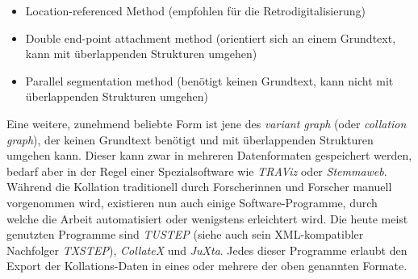 \documentclass{article}
\begin{document}
        \begin{itemize}\item {Location-referenced Method (empfohlen für die Retrodigitalisierung)}\item {Double end-point attachment method (orientiert sich an einem Grundtext, kann
                     mit überlappenden Strukturen umgehen)}\item {Parallel segmentation method (benötigt keinen Grundtext, kann nicht mit
                     überlappenden Strukturen umgehen)}\end{itemize}Eine weitere, zunehmend beliebte Form ist jene des \emph{variant
                     graph} (oder \emph{collation graph}), der keinen Grundtext
                  benötigt und mit überlappenden Strukturen umgehen kann. Dieser kann zwar in
                  mehreren Datenformaten gespeichert werden, bedarf aber in der Regel einer
                  Spezialsoftware wie \emph{TRAViz} oder \emph{Stemmaweb}.\\
            
        Während die Kollation traditionell durch Forscherinnen und Forscher manuell
                  vorgenommen wird, existieren nun auch einige Software-Programme, durch welche die
                  Arbeit automatisiert oder wenigstens erleichtert wird. Die heute meist genutzten
                  Programme sind \emph{TUSTEP} (siehe auch sein XML-kompatibler
                  Nachfolger \emph{TXSTEP}), \emph{CollateX} und \emph{JuXta}. Jedes dieser Programme erlaubt den Export der
                  Kollations-Daten in eines oder mehrere der oben genannten Formate.\\
            
\end{document}
